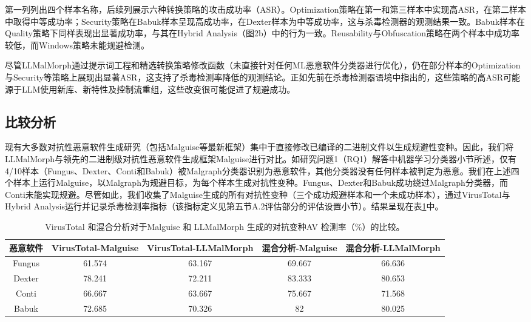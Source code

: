 第一列列出四个样本名称，后续列展示六种转换策略的攻击成功率（ASR）。Optimization策略在第一和第三样本中实现高ASR，在第二样本中取得中等成功率；Security策略在Babuk样本呈现高成功率，在Dexter样本为中等成功率，这与杀毒检测器的观测结果一致。Babuk样本在Quality策略下同样表现出显著成功率，与其在Hybrid Analysis（图2b）中的行为一致。Reusability与Obfuscation策略在两个样本中成功率较低，而Windows策略未能规避检测。


尽管LLMalMorph通过提示词工程和精选转换策略修改函数（未直接针对任何ML恶意软件分类器进行优化），仍在部分样本的Optimization与Security等策略上展现出显著ASR，这支持了杀毒检测率降低的观测结论。正如先前在杀毒检测器语境中指出的，这些策略的高ASR可能源于LLM使用新库、新特性及控制流重组，这些改变很可能促进了规避成功。

\subsection{比较分析}
现有大多数对抗性恶意软件生成研究（包括Malguise\parencite{Ling2024}等最新框架）集中于直接修改已编译的二进制文件以生成规避性变种。因此，我们将LLMalMorph与领先的二进制级对抗性恶意软件生成框架Malguise进行对比。如研究问题1（RQ1）解答中机器学习分类器小节所述，仅有4/10样本（Fungus、Dexter、Conti和Babuk）被Malgraph分类器识别为恶意软件，其他分类器没有任何样本被判定为恶意。我们在上述四个样本上运行Malguise\parencite{Ling2024}，以Malgraph为规避目标，为每个样本生成对抗性变种。Fungus、Dexter和Babuk成功绕过Malgraph分类器，而Conti未能实现规避。尽管如此，我们收集了Malguise生成的所有对抗性变种（三个成功规避样本和一个未成功样本），通过VirusTotal与Hybrid Analysis运行并记录杀毒检测率指标（该指标定义见第五节A.2评估部分的评估设置小节）。结果呈现在表\ref{tab:5.2}中。

\begin{table}[htbp]
	\centering
	\caption{VirusTotal 和混合分析对于Malguise 和 LLMalMorph 生成的对抗变种AV 检测率（\%）的比较。}
	\label{tab:5.2}
	\begin{tabular*}{\textwidth}{@{\extracolsep{\fill}}ccccc}
		\toprule
		恶意软件 & VirusTotal-Malguise & VirusTotal-LLMalMorph & 混合分析-Malguise & 混合分析-LLMalMorph \\
		\midrule
		Fungus & 61.574 & 63.167 & 69.667 & 66.636 \\
		Dexter & 78.241 & 72.211 & 83.333 & 80.653 \\
		Conti & 66.667 & 63.667 & 75.667 & 71.568 \\
		Babuk & 72.685 & 70.326 & 82 & 80.025 \\
		\bottomrule
	\end{tabular*}
\end{table}

